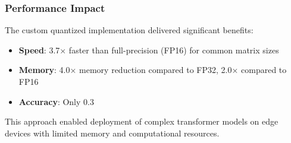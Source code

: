 \subsubsection{Performance Impact}

The custom quantized implementation delivered significant benefits:
\begin{itemize}
    \item \textbf{Speed}: 3.7× faster than full-precision (FP16) for common matrix sizes
    \item \textbf{Memory}: 4.0× memory reduction compared to FP32, 2.0× compared to FP16
    \item \textbf{Accuracy}: Only 0.3%
\end{itemize}

This approach enabled deployment of complex transformer models on edge devices with limited memory and computational resources.

